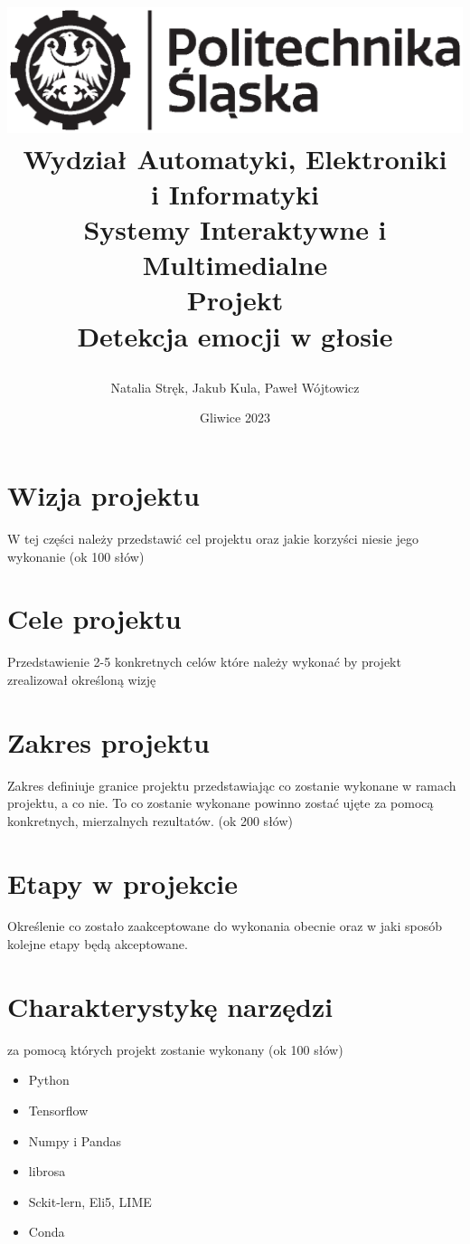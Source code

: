 \documentclass[12pt,titlepage]{article}
\title{
\includegraphics[scale=0.75]{img/politechnika_sl_logo_bw_poziom_pl.eps}\\
\textbf{Wydział Automatyki, Elektroniki\\
i Informatyki}\\
\vspace*{1cm}
Systemy Interaktywne i Multimedialne \\ Projekt \\ Detekcja emocji w głosie

\vspace*{5cm}
}
\author{
Natalia Stręk,
Jakub Kula,
Paweł Wójtowicz
}
\date{Gliwice 2023}
\begin{document}
\maketitle

\tableofcontents

\newpage


\section{Wizja projektu}
W tej części należy przedstawić cel projektu oraz jakie korzyści niesie jego wykonanie (ok 100 słów)\\

\section{Cele projektu}
Przedstawienie 2-5 konkretnych celów które należy wykonać by projekt zrealizował określoną wizję\\

\section{Zakres projektu}
Zakres definiuje granice projektu przedstawiając co zostanie wykonane w ramach projektu, a co nie. To co zostanie wykonane powinno zostać ujęte za pomocą konkretnych, mierzalnych rezultatów. (ok 200 słów)\\

\section{Etapy w projekcie}
Określenie co zostało zaakceptowane do wykonania obecnie oraz w jaki sposób kolejne etapy będą akceptowane.\\

\section{Charakterystykę narzędzi}
za pomocą których projekt zostanie wykonany (ok 100 słów)
\begin{itemize}
    \item Python
    \item Tensorflow
    \item Numpy i Pandas
    \item librosa
    \item Sckit-lern, Eli5, LIME
    \item Conda
\end{itemize}
\end{document}
